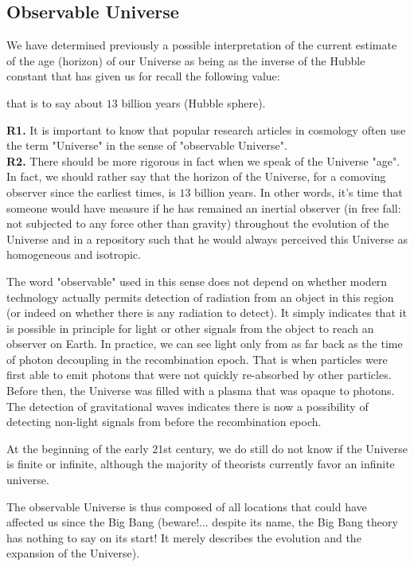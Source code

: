	\subsection{Observable Universe}
	We have determined previously a possible interpretation of the current estimate of the age (horizon) of our Universe as being as the inverse of the Hubble constant that has given us for recall the following value:
	
	that is to say about $13$ billion years (Hubble sphere).
	\begin{tcolorbox}[title=Remarks,colframe=black,arc=10pt]
	\textbf{R1.} It is important to know that popular research articles in cosmology  often use the term "Universe" in the sense of "observable Universe".\\
	
	\textbf{R2.} There should be more rigorous in fact when we speak of the Universe "age". In fact, we should rather say that the horizon of the Universe, for a comoving observer since the earliest times, is $13$ billion years. In other words, it's time that someone would have measure if he has remained an inertial observer (in free fall: not subjected to any force other than gravity) throughout the evolution of the Universe and in a repository such that he would always perceived this Universe as homogeneous and isotropic.
	\end{tcolorbox}
	The word "observable" used in this sense does not depend on whether modern technology actually permits detection of radiation from an object in this region (or indeed on whether there is any radiation to detect). It simply indicates that it is possible in principle for light or other signals from the object to reach an observer on Earth. In practice, we can see light only from as far back as the time of photon decoupling in the recombination epoch. That is when particles were first able to emit photons that were not quickly re-absorbed by other particles. Before then, the Universe was filled with a plasma that was opaque to photons. The detection of gravitational waves indicates there is now a possibility of detecting non-light signals from before the recombination epoch.
	
	At the beginning of the early 21st century, we do still do not know if the Universe is finite or infinite, although the majority of theorists currently favor an infinite universe.

	The observable Universe is thus composed of all locations that could have affected us since the Big Bang (beware!... despite its name, the Big Bang theory has nothing to say on its start! It merely describes the evolution and the expansion of the Universe).

